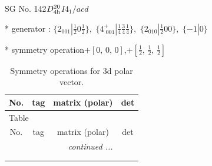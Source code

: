 \documentclass[fleqn,8pt]{jsarticle}
\begin{document}
\setcounter{MaxMatrixCols}{32}

\renewcommand{\tablename}{Table~}
\renewcommand{\figurename}{Figure~}
\begin{center}
\LARGE
SG No. 142\quad$D_{\rm 4h}^{20}$\quad$I4_1/acd$\quad[ tetragonal ]
\end{center}

* generator : $\{2{}_{001}|\frac{1}{2} 0 \frac{1}{2}\},\,\,\{4^{+}_{\,\,001}|\frac{1}{4} \frac{3}{4} \frac{1}{4}\},\,\,\{2{}_{010}|\frac{1}{2} 0 0\},\,\,\{-1|0\}$

* symmetry operation\quad$+\left[ 0,\, 0,\, 0 \right]$,\quad $+\left[ \frac{1}{2},\, \frac{1}{2},\, \frac{1}{2} \right]$
\renewcommand{\arraystretch}{1.3}
\begin{longtable}{cccc}
\caption{Symmetry operations for 3d polar vector.}
 \\
 \hline \hline
No. & tag & matrix (polar) & det \\ \hline \endfirsthead

\multicolumn{3}{l}{\tablename\ \thetable{}} \\
 \hline \hline
No. & tag & matrix (polar) & det \\ \hline \endhead

 \hline \hline
\multicolumn{3}{r}{\footnotesize\it continued ...} \\ \endfoot

 \hline \hline
\multicolumn{3}{r}{} \\ \endlastfoot


\end{longtable}
\end{document}

